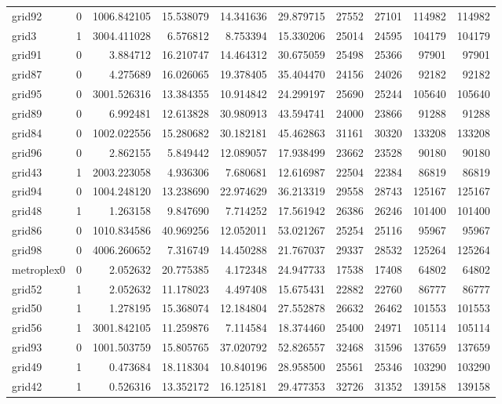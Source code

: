 \begin{longtable}{|l|r|r|r|r|r|r|r|r|r|}
grid92 & 0 & 1006.842105 & 15.538079 & 14.341636 & 29.879715 & 27552 & 27101 & 114982 & 114982 \\
grid3 & 1 & 3004.411028 & 6.576812 & 8.753394 & 15.330206 & 25014 & 24595 & 104179 & 104179 \\
grid91 & 0 & 3.884712 & 16.210747 & 14.464312 & 30.675059 & 25498 & 25366 & 97901 & 97901 \\
grid87 & 0 & 4.275689 & 16.026065 & 19.378405 & 35.404470 & 24156 & 24026 & 92182 & 92182 \\
grid95 & 0 & 3001.526316 & 13.384355 & 10.914842 & 24.299197 & 25690 & 25244 & 105640 & 105640 \\
grid89 & 0 & 6.992481 & 12.613828 & 30.980913 & 43.594741 & 24000 & 23866 & 91288 & 91288 \\
grid84 & 0 & 1002.022556 & 15.280682 & 30.182181 & 45.462863 & 31161 & 30320 & 133208 & 133208 \\
grid96 & 0 & 2.862155 & 5.849442 & 12.089057 & 17.938499 & 23662 & 23528 & 90180 & 90180 \\
grid43 & 1 & 2003.223058 & 4.936306 & 7.680681 & 12.616987 & 22504 & 22384 & 86819 & 86819 \\
grid94 & 0 & 1004.248120 & 13.238690 & 22.974629 & 36.213319 & 29558 & 28743 & 125167 & 125167 \\
grid48 & 1 & 1.263158 & 9.847690 & 7.714252 & 17.561942 & 26386 & 26246 & 101400 & 101400 \\
grid86 & 0 & 1010.834586 & 40.969256 & 12.052011 & 53.021267 & 25254 & 25116 & 95967 & 95967 \\
grid98 & 0 & 4006.260652 & 7.316749 & 14.450288 & 21.767037 & 29337 & 28532 & 125264 & 125264 \\
metroplex0 & 0 & 2.052632 & 20.775385 & 4.172348 & 24.947733 & 17538 & 17408 & 64802 & 64802 \\
grid52 & 1 & 2.052632 & 11.178023 & 4.497408 & 15.675431 & 22882 & 22760 & 86777 & 86777 \\
grid50 & 1 & 1.278195 & 15.368074 & 12.184804 & 27.552878 & 26632 & 26462 & 101553 & 101553 \\
grid56 & 1 & 3001.842105 & 11.259876 & 7.114584 & 18.374460 & 25400 & 24971 & 105114 & 105114 \\
grid93 & 0 & 1001.503759 & 15.805765 & 37.020792 & 52.826557 & 32468 & 31596 & 137659 & 137659 \\
grid49 & 1 & 0.473684 & 18.118304 & 10.840196 & 28.958500 & 25561 & 25346 & 103290 & 103290 \\
grid42 & 1 & 0.526316 & 13.352172 & 16.125181 & 29.477353 & 32726 & 31352 & 139158 & 139158 \\

\end{longtable}
